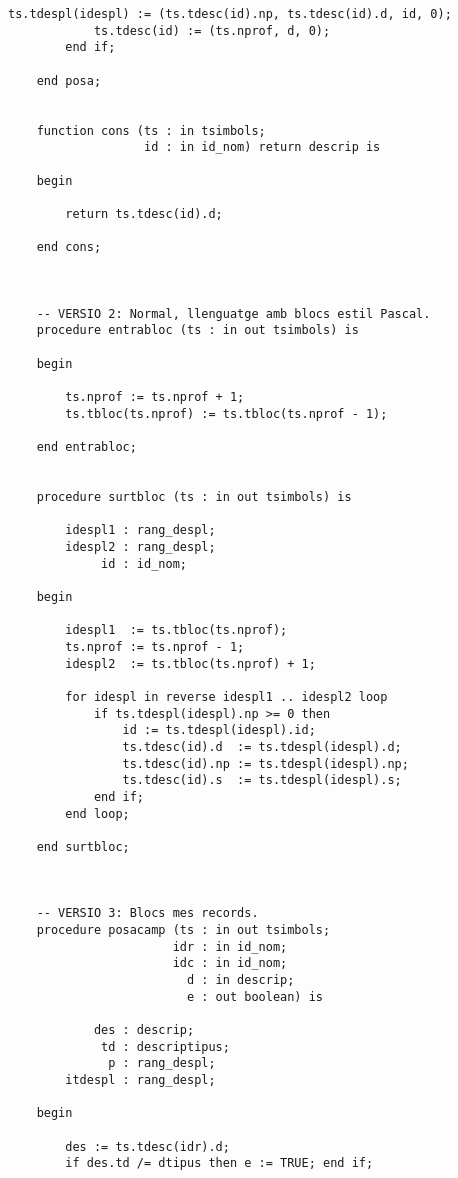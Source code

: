 \documentclass[10pt]{report}
\begin{document}
\begin{lstlisting}[style=Ada]
            ts.tdespl(idespl) := (ts.tdesc(id).np, ts.tdesc(id).d, id, 0);
            ts.tdesc(id) := (ts.nprof, d, 0);
        end if;
    
    end posa;
    
    
    function cons (ts : in tsimbols;
                   id : in id_nom) return descrip is
                    
    begin
    
        return ts.tdesc(id).d;
    
    end cons;
    
    
    
    -- VERSIO 2: Normal, llenguatge amb blocs estil Pascal.
    procedure entrabloc (ts : in out tsimbols) is
    
    begin
    
        ts.nprof := ts.nprof + 1;
        ts.tbloc(ts.nprof) := ts.tbloc(ts.nprof - 1);
    
    end entrabloc;
    
    
    procedure surtbloc (ts : in out tsimbols) is
    
        idespl1 : rang_despl;
        idespl2 : rang_despl;
             id : id_nom;
        
    begin
    
        idespl1  := ts.tbloc(ts.nprof);
        ts.nprof := ts.nprof - 1;
        idespl2  := ts.tbloc(ts.nprof) + 1;
        
        for idespl in reverse idespl1 .. idespl2 loop
            if ts.tdespl(idespl).np >= 0 then
                id := ts.tdespl(idespl).id;
                ts.tdesc(id).d  := ts.tdespl(idespl).d;
                ts.tdesc(id).np := ts.tdespl(idespl).np;
                ts.tdesc(id).s  := ts.tdespl(idespl).s;
            end if;
        end loop;
    
    end surtbloc;
    
    
    
    -- VERSIO 3: Blocs mes records.
    procedure posacamp (ts : in out tsimbols;
                       idr : in id_nom;
                       idc : in id_nom;
                         d : in descrip;
                         e : out boolean) is
                          
            des : descrip;
             td : descriptipus;
              p : rang_despl;
        itdespl : rang_despl;
    
    begin
    
        des := ts.tdesc(idr).d;
        if des.td /= dtipus then e := TRUE; end if;
        

\end{lstlisting}
\end{document}
